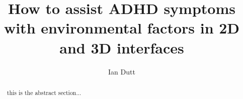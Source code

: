 \documentclass[sigconf]{acmart}
\begin{document}
 
\title{How to assist ADHD symptoms with environmental factors in 2D and 3D interfaces}
 
\author{Ian Dutt}
 

 
 
\renewcommand{\shortauthors}{}
 
\begin{abstract}
this is the abstract section...
\end{abstract}
 
\end{document}
